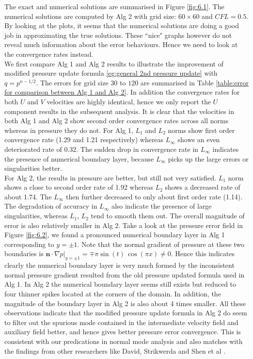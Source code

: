 The exact and numerical solutions are summarised in Figure \ref{fig:6.1}. The numerical solutions are computed by Alg 2 with grid size: $60 \times 60$ and $CFL = 0.5$. By looking at the plots, it seems that the numerical solutions are doing a good job in approximating the true solutions. These ``nice" graphs however do not reveal much information about the error behaviours. Hence we need to look at the convergence rates instead.\\

We first compare Alg 1 and Alg 2 results to illustrate the improvement of modified pressure update formula \eqref{eg:general 2nd pressure update} with $q = p^{n-1/2}$. The errors for grid size $30$ to $120$ are summarised in Table \ref{table:error for comparison between Alg 1 and Alg 2}. In addition the convergence rates for both $U$ and $V$ velocities are highly identical, hence we only report the $U$ component results in the subsequent analysis. It is clear that the velocities in both Alg 1 and Alg 2 show second order convergence rates across all norms whereas in pressure they do not. For Alg 1, $L_1$ and $L_2$ norms show first order convergence rate (1.29 and 1.21 respectively) whereas $L_\infty$ shows an even deteriorated rate of 0.32. The sudden drop in convergence rate in $L_\infty$ indicates the presence of numerical boundary layer, because $L_\infty$ picks up the large errors or singularities better. \\
   For Alg 2, the results in pressure are better, but still not very satisfied. $L_1$ norm shows a close to second order rate of 1.92 whereas $L_2$ shows a decreased rate of about 1.74. The $L_\infty$ then further decreased to only about first order rate (1.14). The degradation of accuracy in $L_\infty$ also indicate the presence of large singularities, whereas $L_1,\,L_2$ tend to smooth them out. The overall magnitude of error is also relatively smaller in Alg 2. Take a look at the pressure error field in Figure \ref{fig:6.2}, we found a pronounced numerical boundary layer in Alg 1 corresponding to $y = \pm 1$. Note that the normal gradient of pressure at these two boundaries is $\textbf{n}\cdot \nabla p |_{y = \pm 1} = \mp \pi \sin(t)\,\cos(\pi x) \neq 0$. Hence this indicates clearly the numerical boundary layer is very much formed by the inconsistent normal pressure gradient resulted from the old pressure updated formula used in Alg 1. In Alg 2 the numerical boundary layer seems still exists but reduced to four thinner spikes located at the corners of the domain. In addition, the magnitude of the boundary layer in Alg 2 is also about 4 times smaller. All these observations indicate that the modified pressure update formula in Alg 2 do seem to filter out the spurious mode contained in the intermediate velocity field and auxiliary field better, and hence gives better pressure error convergence. This is consistent with our predications in normal mode analysis and also matches with the findings from other researchers like David, Strikwerda and Shen et al \cite{brown2001accurate, strikwerda1999accuracy, guermond2006overview, guermond2004error}.
